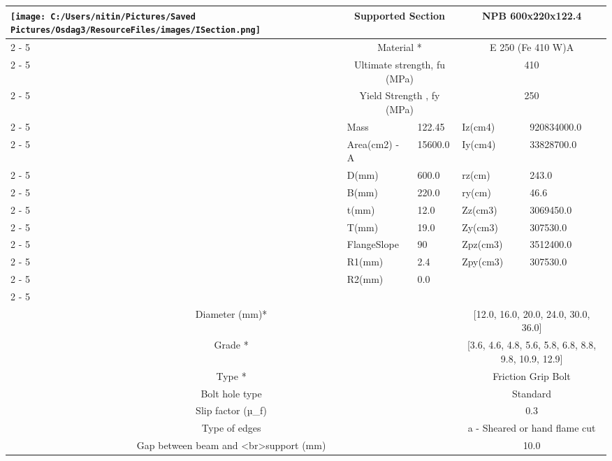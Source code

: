 \documentclass{article}%
\begin{document}
\begin{longtable}{|p{5cm}|p{2cm}|p{2cm}|p{2cm}|p{5cm}|}
\hline%
\hline%
\multirow{13}{*}{\texttt{[image: C:/Users/nitin/Pictures/Saved Pictures/Osdag3/ResourceFiles/images/ISection.png]}}&\multicolumn{2}{|c|}{Supported Section}&\multicolumn{2}{|c|}{NPB 600x220x122.4}\\%
\cline{2%
-%
5}%
&\multicolumn{2}{|c|}{Material *}&\multicolumn{2}{|c|}{E 250 (Fe 410 W)A}\\%
\cline{2%
-%
5}%
&\multicolumn{2}{|c|}{Ultimate strength, fu (MPa)}&\multicolumn{2}{|c|}{410}\\%
\cline{2%
-%
5}%
&\multicolumn{2}{|c|}{Yield Strength , fy (MPa)}&\multicolumn{2}{|c|}{250}\\%
\cline{2%
-%
5}%
&Mass&122.45&Iz(cm4)&920834000.0\\%
\cline{2%
-%
5}%
&Area(cm2) {-} A&15600.0&Iy(cm4)&33828700.0\\%
\cline{2%
-%
5}%
&D(mm)&600.0&rz(cm)&243.0\\%
\cline{2%
-%
5}%
&B(mm)&220.0&ry(cm)&46.6\\%
\cline{2%
-%
5}%
&t(mm)&12.0&Zz(cm3)&3069450.0\\%
\cline{2%
-%
5}%
&T(mm)&19.0&Zy(cm3)&307530.0\\%
\cline{2%
-%
5}%
&FlangeSlope&90&Zpz(cm3)&3512400.0\\%
\cline{2%
-%
5}%
&R1(mm)&2.4&Zpy(cm3)&307530.0\\%
\cline{2%
-%
5}%
&R2(mm)&0.0&&\\%
\cline{2%
-%
5}%
\hline%
\multicolumn{5}{|c|}{\textbf{Bolt Details}}\\%
\hline%
\hline%
\multicolumn{3}{|c|}{Diameter (mm)*}&\multicolumn{2}{|c|}{{[}12.0, 16.0, 20.0, 24.0, 30.0, 36.0{]}}\\%
\hline%
\hline%
\multicolumn{3}{|c|}{Grade *}&\multicolumn{2}{|c|}{{[}3.6, 4.6, 4.8, 5.6, 5.8, 6.8, 8.8, 9.8, 10.9, 12.9{]}}\\%
\hline%
\hline%
\multicolumn{3}{|c|}{Type *}&\multicolumn{2}{|c|}{Friction Grip Bolt}\\%
\hline%
\hline%
\multicolumn{3}{|c|}{Bolt hole type}&\multicolumn{2}{|c|}{Standard}\\%
\hline%
\hline%
\multicolumn{3}{|c|}{Slip factor (µ\_f)}&\multicolumn{2}{|c|}{0.3}\\%
\hline%
\hline%
\multicolumn{3}{|c|}{Type of edges}&\multicolumn{2}{|c|}{a {-} Sheared or hand flame cut}\\%
\hline%
\hline%
\multicolumn{3}{|c|}{Gap between beam and <br>support (mm)}&\multicolumn{2}{|c|}{10.0}\\%

\end{longtable}
\end{document}
